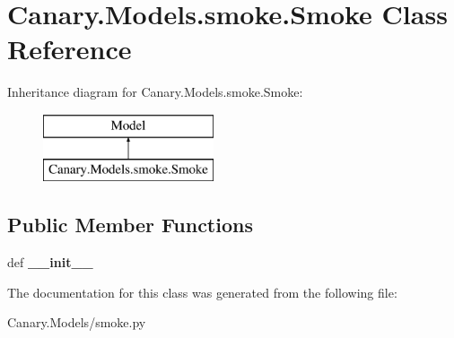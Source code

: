 \hypertarget{class_canary_8_models_1_1smoke_1_1_smoke}{\section{Canary.\-Models.\-smoke.\-Smoke Class Reference}
\label{class_canary_8_models_1_1smoke_1_1_smoke}
}
Inheritance diagram for Canary.\-Models.\-smoke.\-Smoke\-:\begin{figure}[H]
\begin{center}
\leavevmode
\includegraphics[height=2.000000cm]{class_canary_8_models_1_1smoke_1_1_smoke}
\end{center}
\end{figure}
\subsection*{Public Member Functions}
\begin{DoxyCompactItemize}
\item 
\hypertarget{class_canary_8_models_1_1smoke_1_1_smoke_a1282027843830946bdf3056743e20d8f}{def {\bfseries \-\_\-\-\_\-init\-\_\-\-\_\-}}\label{class_canary_8_models_1_1smoke_1_1_smoke_a1282027843830946bdf3056743e20d8f}

\end{DoxyCompactItemize}


The documentation for this class was generated from the following file\-:\begin{DoxyCompactItemize}
\item 
Canary.\-Models/smoke.\-py\end{DoxyCompactItemize}

